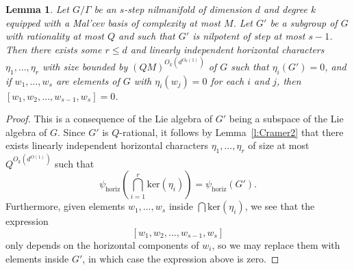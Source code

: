 \documentclass[11pt, a4paper]{amsart}
\theoremstyle{plain}
\theoremstyle{plain}
\newtheorem{lemma}{Lemma}
\theoremstyle{definition}
\theoremstyle{remark}
\numberwithin{equation}{section}
\numberwithin{lemma}{section}
\numberwithin{proposition}{section}
\numberwithin{corollary}{section}
\numberwithin{definition}{section}
\numberwithin{claim}{section}
\begin{document}
\begin{lemma}\label{l:lowerstep}
    Let $G/\Gamma$ be an $s$-step nilmanifold of dimension $d$ and degree $k$ equipped with a Mal'cev basis of complexity at most $M$. Let $G'$ be a subgroup of $G$ with rationality at most $Q$ and such that $G'$ is nilpotent of step at most $s - 1$. Then there exists some $r \le d$ and linearly independent horizontal characters $\eta_1, \dots, \eta_r$ with size bounded by $(QM)^{O_k(d^{O_k(1)})}$ of $G$ such that $\eta_i(G') = 0$, and if $w_1, \dots, w_s$ are elements of $G$ with $\eta_i(w_j) = 0$ for each $i$ and $j$, then $[w_1, w_2, \dots, w_{s - 1}, w_s] = 0$.
\end{lemma}
\begin{proof}
    This is a consequence of the Lie algebra of $G'$ being a subspace of the Lie algebra of $G$. Since $G'$ is $Q$-rational, it follows by Lemma~\ref{l:Cramer2} that there exists linearly independent horizontal characters $\eta_1, \dots, \eta_r$ of size at most $Q^{O_k(d^{O(1)})}$ such that
    $$\psi_{\operatorname{horiz}}\left(\bigcap_{i = 1}^r \mathrm{ker}(\eta_i)\right) = \psi_{\operatorname{horiz}}(G').$$
    Furthermore, given elements $w_1, \dots, w_s$ inside $\bigcap \mathrm{ker}(\eta_i)$, we see that the expression
    $$[w_1, w_2, \dots, w_{s - 1}, w_s]$$
    only depends on the horizontal components of $w_i$, so we may replace them with elements inside $G'$, in which case the expression above is zero. 
\end{proof}
\end{document}
